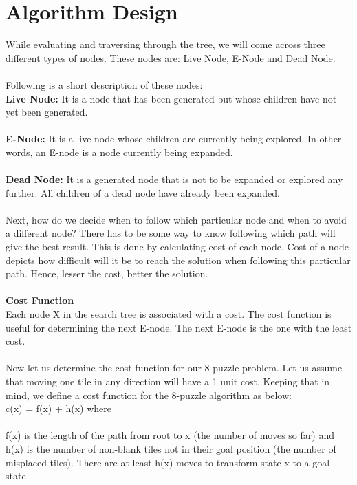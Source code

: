 \section{Algorithm Design}
While evaluating and traversing through the tree, we will come across three different types of nodes. These nodes are: Live Node, E-Node and Dead Node.\\\\
Following is a short description of these nodes:\\
\textbf{Live Node: } It is a node that has been generated but whose children have not yet been generated. \\\\
\textbf{E-Node: } It is a live node whose children are currently being explored. In other words, an E-node is a node currently being expanded.  \\\\
\textbf{Dead Node: } It is a generated node that is not to be expanded or explored any further. All children of a dead node have already been expanded. \\\\
Next, how do we decide when to follow which particular node and when to avoid a different node? There has to be some way to know following which path will give the best result. This is done by calculating cost of each node. Cost of a node depicts how difficult will it be to reach the solution when following this particular path. Hence, lesser the cost, better the solution.\\\\
\textbf{Cost Function }\\Each node X in the search tree is associated with a cost. The cost function is useful for determining the next E-node. The next E-node is the one with the least cost.\\
\\

Now let us determine the cost function for our 8 puzzle problem. Let us assume that moving one tile in any direction will have a 1 unit cost. Keeping that in mind, we define a cost function for the 8-puzzle algorithm as below: \\

c(x) = f(x) + h(x) where\\\\
f(x) is the length of the path from root to x (the number of moves so far) and\\
h(x) is the number of non-blank tiles not in their goal position (the number of misplaced tiles). There are at least h(x) moves to transform state x to a goal state\\

